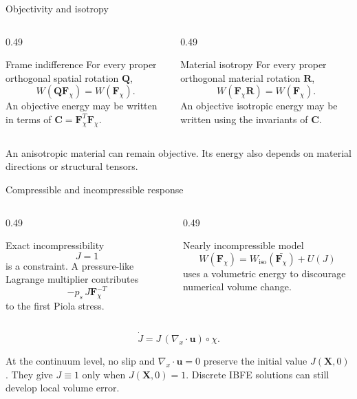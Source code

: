 \documentclass[aspectratio=169,11pt]{beamer}
\newcommand{\X}{\bm{X}}
\newcommand{\uEuler}{\bm{u}}
\newcommand{\Fdef}{\bm{F}_{\chi}}
\newcommand{\Cten}{\bm{C}}
\newcommand{\divx}{\nabla_{\!x}\!\cdot}
\begin{document}
\begin{frame}{Objectivity and isotropy}
\begin{columns}[T,onlytextwidth]
\begin{column}{0.49\textwidth}
\begin{block}{Frame indifference}
For every proper orthogonal spatial rotation \(\bm{Q}\),
\[
  W(\bm{Q}\Fdef)=W(\Fdef).
\]
An objective energy may be written in terms of
\(\Cten=\Fdef^T\Fdef\).
\end{block}
\end{column}
\begin{column}{0.49\textwidth}
\begin{block}{Material isotropy}
For every proper orthogonal material rotation \(\bm{R}\),
\[
  W(\Fdef\bm{R})=W(\Fdef).
\]
An objective isotropic energy may be written using the invariants of \(\Cten\).
\end{block}
\end{column}
\end{columns}
\medskip
\begin{punchbox}
\small
An anisotropic material can remain objective. Its energy also depends on material directions or structural tensors.
\end{punchbox}
\end{frame}

\begin{frame}{Compressible and incompressible response}
\small
\begin{columns}[T,onlytextwidth]
\begin{column}{0.49\textwidth}
\begin{block}{Exact incompressibility}
\[
  J=1
\]
is a constraint. A pressure-like Lagrange multiplier contributes
\[
  -p_s\,J\Fdef^{-T}
\]
to the first Piola stress.
\end{block}
\end{column}
\begin{column}{0.49\textwidth}
\begin{block}{Nearly incompressible model}
\[
  W(\Fdef)
  =
  W_{\mathrm{iso}}(\bar{\Fdef})+U(J)
\]
uses a volumetric energy to discourage numerical volume change.
\end{block}
\end{column}
\end{columns}
\[
  \dot J
  =
  J\,(\divx\uEuler)\circ\chi .
\]
\begin{punchbox}
\small
At the continuum level, no slip and \(\divx\uEuler=0\) preserve the initial value \(J(\X,0)\). They give \(J\equiv1\) only when \(J(\X,0)=1\). Discrete IBFE solutions can still develop local volume error.
\end{punchbox}
\end{frame}
\end{document}
